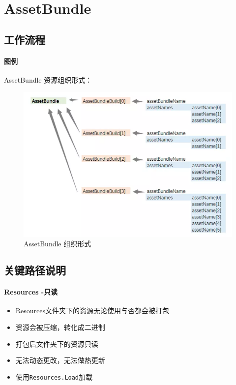 \documentclass[UTF8,a4paper,12pt]{ctexbook}
\begin{document}
	\section{AssetBundle}	
		\subsection{工作流程}
			
			\paragraph{图例}AssetBundle 资源组织形式：
				\begin{figure}[H]
					\centering
					\includegraphics[scale=0.7]{AssetBundle}
					\caption{AssetBundle 组织形式}
				\end{figure}
		
		\subsection{关键路径说明}
			\paragraph{Resources -只读}
				\begin{itemize}
					\item Resources文件夹下的资源无论使用与否都会被打包
					\item 资源会被压缩，转化成二进制
					\item 打包后文件夹下的资源只读
					\item 无法动态更改，无法做热更新
					\item 使用\verb|Resources.Load|加载
				\end{itemize}
				
\end{document}
